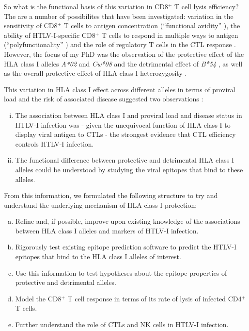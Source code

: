 So what is the functional basis of this variation in CD8$^+$ T cell lysis efficiency? The are a number of possibilites that have been investigated: variation in the sensitivity of CD8$^+$ T cells to antigen concentration (``functional avidity'' \citep{Kattan2009}), the ability of HTLV-I-specific CD8$^+$ T cells to respond in multiple ways to antigen (``polyfunctionality'' \citep{Bangham2009}) and the role of regulatory T cells in the CTL response \citep{Toulza2008}. However, the focus of my PhD was the observation of the protective effect of the HLA class I alleles \emph{A*02} and \emph{Cw*08} and the detrimental effect of \emph{B*54} \citep{Jeffery1999}, as well as the overall protective effect of HLA class I heterozygosity \citep{Jeffery2000}.

This variation in HLA class I effect across different alleles in terms of proviral load and the risk of associated disease suggested two observations :

\begin{enumerate}[(i)]
\item The association between HLA class I and proviral load and disease status in HTLV-I infection was - given the unequivocal function of HLA class I to display viral antigen to CTLs - the strongest evidence that CTL efficiency controls HTLV-I infection.
\item The functional difference between protective and detrimental HLA class I alleles could be understood by studying the viral epitopes that bind to these alleles.
\end{enumerate}

From this information, we formulated the following structure to try and understand the underlying mechanism of HLA class I protection:

\begin{enumerate}[(a)]
\item Refine and, if possible, improve upon existing knowledge of the associations between HLA class I alleles and markers of HTLV-I infection.
\item Rigorously test existing epitope prediction software to predict the HTLV-I epitopes that bind to the HLA class I alleles of interest.
\item Use this information to test hypotheses about the epitope properties of protective and detrimental alleles.
\item Model the CD8$^+$ T cell response in terms of its rate of lysis of infected CD4$^+$ T cells.
\item Further understand the role of CTLs and NK cells in HTLV-I infection.
\end{enumerate}

